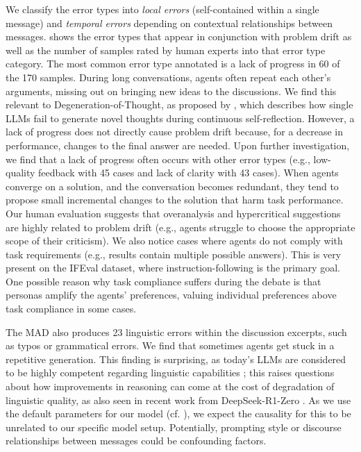 We classify the error types into \textit{local errors} (self-contained within a single message) and \textit{temporal errors} depending on contextual relationships between messages.
 shows the error types that appear in conjunction with problem drift as well as the number of samples rated by human experts into that error type category.
The most common error type annotated is a lack of progress in 60 of the 170 samples.
During long conversations, agents often repeat each other's arguments, missing out on bringing new ideas to the discussions.
We find this relevant to Degeneration-of-Thought, as proposed by \citet{degenofthought}, which describes how single LLMs fail to generate novel thoughts during continuous self-reflection.
However, a lack of progress does not directly cause problem drift because, for a decrease in performance, changes to the final answer are needed.
Upon further investigation, we find that a lack of progress often occurs with other error types (e.g., low-quality feedback with 45 cases and lack of clarity with 43 cases).
When agents converge on a solution, and the conversation becomes redundant, they tend to propose small incremental changes to the solution that harm task performance.
Our human evaluation suggests that overanalysis and hypercritical suggestions are highly related to problem drift (e.g., agents struggle to choose the appropriate scope of their criticism).
We also notice cases where agents do not comply with task requirements (e.g., results contain multiple possible answers).
This is very present on the IFEval dataset, where instruction-following is the primary goal.
One possible reason why task compliance suffers during the debate is that personas amplify the agents' preferences, valuing individual preferences above task compliance in some cases.

The MAD also produces 23 linguistic errors within the discussion excerpts, such as typos or grammatical errors.
We find that sometimes agents get stuck in a repetitive generation.
This finding is surprising, as today's LLMs are considered to be highly competent regarding linguistic capabilities \citep{GrattafioriDJP24a}; this raises questions about how improvements in reasoning can come at the cost of degradation of linguistic quality, as also seen in recent work from DeepSeek-R1-Zero \citep{deepseekai2025deepseekr1incentivizingreasoningcapability}.
As we use the default parameters for our model (cf. ), we expect the causality for this to be unrelated to our specific model setup.
Potentially, prompting style or discourse relationships between messages could be confounding factors.

